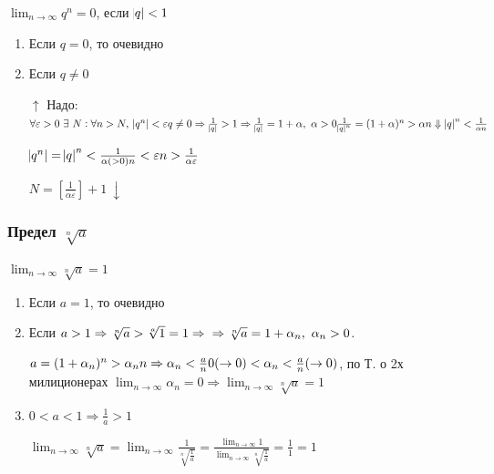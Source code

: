\documentclass{article}
\begin{document}
    \(\lim_{n \rightarrow \infty}{q^n} = 0\), если \(\abs{q} < 1\)
        
        \begin{enumerate}
        	\item Если \(q = 0\), то очевидно
            
            \item Если \(q \not = 0\)
            
            \(\uparrow\) Надо: \(\forall \varepsilon > 0\ \exists\ N : \forall n > N,\ \abs{q^n} < \varepsilon
            \\ q \not = 0 \Rightarrow \frac{1}{\abs{q}} > 1 \Rightarrow \frac{1}{\abs{q}} = 1 + \alpha,\ \alpha > 0\\
            \frac{1}{\abs{q}^n} = (1 + \alpha)^n > \alpha n\\ \Downarrow\\ \abs{q}^n < \frac{1}{\alpha n}\)
            
            \(\abs{q^n} = \abs{q}^n < \frac{1}{\alpha(> 0) n} < \varepsilon\\ n > \frac{1}{\alpha \varepsilon}\)
            
            \(N = [\frac{1}{\alpha \varepsilon}] + 1\ \downarrow\)
        \end{enumerate}
        
    \subsubsection{Предел \(\sqrt[n]{a}\)}
        
        \(\lim_{n \rightarrow \infty}{\sqrt[n]{a}} = 1\)
        \begin{enumerate}
        	\item Если \(a = 1\), то очевидно
            
            \item Если \(a > 1 \Rightarrow \sqrt[n]{a} > \sqrt[a]{1} = 1 \Rightarrow\\
            \Rightarrow \sqrt[n]{a} = 1 + \alpha_n,\ \alpha_n > 0\).
            
            \(a = (1 + \alpha_n)^n > \alpha_n n \Rightarrow \alpha_n < \frac{a}{n}\\
            0(\rightarrow 0) < \alpha_n < \frac{a}{n}(\rightarrow 0)\), по Т. о 2х милиционерах \(\lim_{n \rightarrow \infty}{\alpha_n} = 0 \Rightarrow \lim_{n \rightarrow \infty}{\sqrt[n]{a}} = 1\)
            
            \item \(0 < a < 1 \Rightarrow \frac{1}{a} > 1\)
            
            \(\lim_{n \rightarrow \infty}{\sqrt[n]{a}} = \lim_{n \rightarrow \infty}{\frac{1}{\sqrt[n]{\frac{1}{a}}}} = \frac{\lim_{n \rightarrow \infty}{1}}{\lim_{n \rightarrow \infty}{\sqrt[n]{\frac{1}{a}}}}
            = \frac{1}{1} = 1\)
        \end{enumerate}
        
\end{document}

